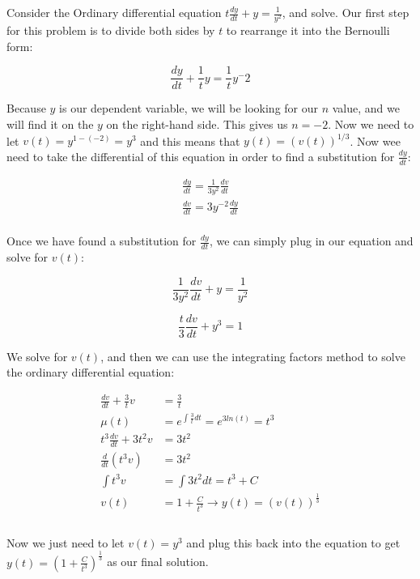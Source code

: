     \begin{problem}
      Consider the Ordinary differential equation $t\frac{dy}{dt}+y=\frac{1}{y^2}$, and solve. Our first step for this problem is to divide both sides by $t$ to rearrange it into the Bernoulli form:

      \begin{equation}
        \frac{dy}{dt}+\frac{1}{t}y=\frac{1}{t}y^-2
      \end{equation}

      Because $y$ is our dependent variable, we will be looking for our $n$ value, and we will find it on the $y$ on the right-hand side. This gives us $n=-2$. Now we need to let $v(t)=y^{1-(-2)}=y^3$ and this means that $y(t)=(v(t))^{1/3}$. Now wee need to take the differential of this equation in order to find a substitution for $\frac{dy}{dt}$:

      \begin{align}
        \frac{dy}{dt}=\frac{1}{3y^2}\frac{dv}{dt}\\
        \frac{dv}{dt}=3y^{-2}\frac{dy}{dt}\\
      \end{align}

      Once we have found a substitution for $\frac{dy}{dt}$, we can simply plug in our equation and solve for $v(t)$:

      \begin{equation}
        \frac{1}{3y^2}\frac{dv}{dt}+y=\frac{1}{y^2}
      \end{equation}

      \begin{equation}
        \frac{t}{3}\frac{dv}{dt}+y^3=1
      \end{equation}

      We solve for $v(t)$, and then we can use the integrating factors method to solve the ordinary differential equation:

      \begin{equation}
        \begin{aligned}
          \frac{dv}{dt}+\frac{3}{t}v&=\frac{3}{t}\\
          \mu(t)&=e^{\int\frac{3}{t}dt}=e^{3ln(t)}=t^3\\
          t^3\frac{dv}{dt}+3t^2v&=3t^2\\
          \frac{d}{dt}(t^3v)&=3t^2\\
          \int t^3v&=\int3t^2dt=t^3+C\\
          v(t)&=1+\frac{C}{t^3}\to y(t)=(v(t))^{\frac{1}{3}}\\
        \end{aligned} 
      \end{equation}\\

      Now we just need to let $v(t)=y^3$ and plug this back into the equation to get $y(t)=\left(1+\frac{C}{t^3}\right)^{\frac{1}{3}}$ as our final solution.
    \end{problem}

